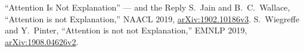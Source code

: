 \begin{frame}{``Attention Is Not Explanation'' --- and the Reply}
    \vspace{0.1em}
    {\scriptsize S.~Jain and B.~C.~Wallace, ``Attention is not Explanation,'' NAACL 2019,
    \href{https://arxiv.org/abs/1902.10186v3}{arXiv:1902.10186v3}. S.~Wiegreffe and Y.~Pinter,
    ``Attention is not not Explanation,'' EMNLP 2019,
    \href{https://arxiv.org/abs/1908.04626v2}{arXiv:1908.04626v2}.}
\end{frame}
